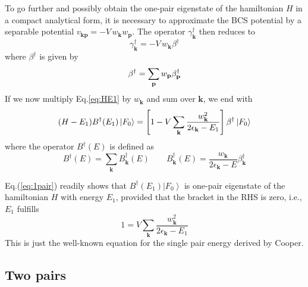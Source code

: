 \documentclass[aps,prb,superscriptaddress,showpacs,reprint,lengthcheck]{revtex4}
\newcommand{\vk}{\ensuremath{\mathbf{k}}}
\newcommand{\vp}{\ensuremath{\mathbf{p}}}
\begin{document}
To go further and possibly obtain the one-pair eigenstate of the hamiltonian $H$
in a compact analytical form, it is necessary to approximate the BCS potential by a separable potential $v_{\mathbf{k} \mathbf{p} }=-V\,w_\vk{}w_\vp$.
The operator $\gamma^\dagger_\vk$ then reduces to  
\begin{equation}\gamma^{\dagger}_\vk=-V\,w_\vk\beta^{\dagger}
\end{equation} 
where $\beta^\dagger$ is given by
\begin{equation}  \label{eq:gammaBeta}
\beta^{\dagger}=\sum_%
\vp{}w_\vp\beta^{\dagger}_\vp
\end{equation}
If we  now multiply Eq.\eqref{eq:HE1} by $w_\vk$ and sum over $\mathbf{k} $,
we end with 
\begin{equation}\label{eq:1pair}
(H-E _1)B^{\dagger}(E _1)\left|F_0\right>  =\left[1-V\sum_\vk{%
\frac{w_\vk^2}{2\epsilon_\vk-E _1}}\right]
\beta^{\dagger}\left|F_0\right>  
\end{equation}
where the operator $B^{\dagger}(E)$ is defined as  
\begin{equation}  \label{eq:B}
B^{\dagger}(E)=\sum_\vk{B_\vk^{\dagger}(E)}\quad\quad B_\vk^{\dagger}(E)=\frac{w_\vk}{2\epsilon_\vk-E}\beta^{\dagger}_\vk
\end{equation}

Eq.(\ref{eq:1pair}) readily shows that  $B^{\dagger}(%
E _1)\left|F_0\right> $ is  one-pair eigenstate of the hamiltonian $H$ with energy  $%
E _1$, provided that the bracket in the RHS is zero, i.e., $E_1$  fulfills
\begin{equation}  \label{eq:SchOne}
1=V\sum_\vk{\frac{w_\vk^2}{2\epsilon_\vk-E _1}}
\end{equation}
This is just the well-known equation for the single pair energy
derived by Cooper.

\subsection{Two pairs}
\end{document}
